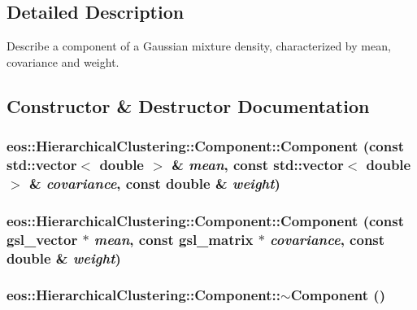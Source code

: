 \subsection{Detailed Description}
Describe a component of a Gaussian mixture density, characterized by mean, covariance and weight. 

\subsection{Constructor \& Destructor Documentation}
\hypertarget{classeos_1_1HierarchicalClustering_1_1Component_a1720f61d18110629f9e729a1bf9d81e8}{
\subsubsection[{Component}]{\setlength{\rightskip}{0pt plus 5cm}eos::HierarchicalClustering::Component::Component (const std::vector$<$ double $>$ \& {\em mean}, \/  const std::vector$<$ double $>$ \& {\em covariance}, \/  const double \& {\em weight})}}
\label{classeos_1_1HierarchicalClustering_1_1Component_a1720f61d18110629f9e729a1bf9d81e8}
\hypertarget{classeos_1_1HierarchicalClustering_1_1Component_a51da212f42ff52a2c85e7b870996f27c}{
\subsubsection[{Component}]{\setlength{\rightskip}{0pt plus 5cm}eos::HierarchicalClustering::Component::Component (const gsl\_\-vector $\ast$ {\em mean}, \/  const gsl\_\-matrix $\ast$ {\em covariance}, \/  const double \& {\em weight})}}
\label{classeos_1_1HierarchicalClustering_1_1Component_a51da212f42ff52a2c85e7b870996f27c}
\hypertarget{classeos_1_1HierarchicalClustering_1_1Component_ab54a490e72686f90c0bf78ea9f756722}{
\subsubsection[{$\sim$Component}]{\setlength{\rightskip}{0pt plus 5cm}eos::HierarchicalClustering::Component::$\sim$Component ()}}
\label{classeos_1_1HierarchicalClustering_1_1Component_ab54a490e72686f90c0bf78ea9f756722}



